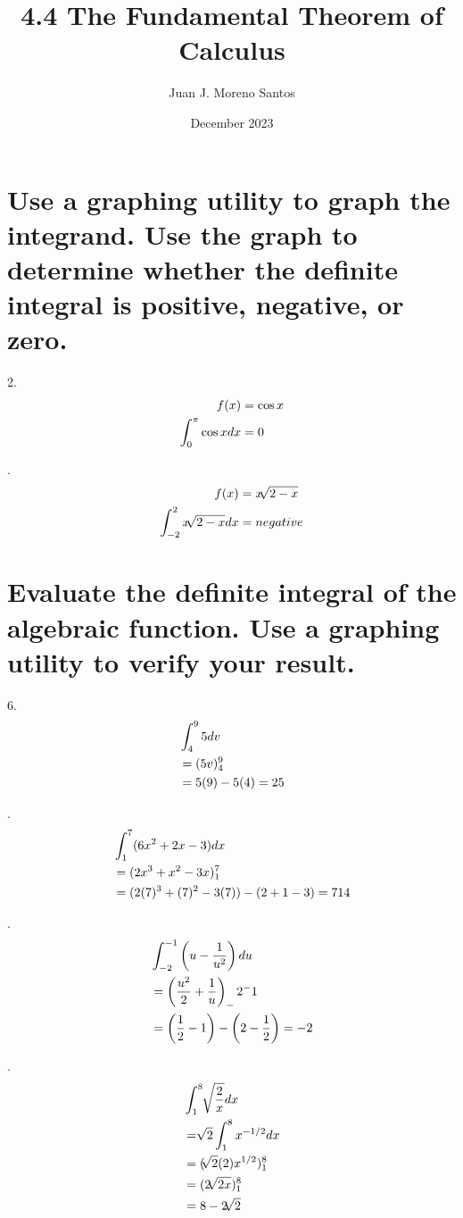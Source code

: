 \documentclass[11pt]{article}
\newcommand*{\vs}{\vspace{1cm}}
\newcommand*{\next}{\noindent}
\newcommand*{\set}{\setcounter{equation}{0}}
\begin{document}
\title{4.4 The Fundamental Theorem of Calculus}
\author{Juan J. Moreno Santos}
\date{December 2023}

\maketitle

\section{Use a graphing utility
to graph the integrand. Use the graph to determine whether the
definite integral is positive, negative, or zero.}
2.\begin{align}
    \set
    f(x)&=\cos x\\
    \int_{0}^{\pi}\cos xdx&=0
\end{align}

\vs\next
4.\begin{align}
    \set
    f(x)&=x\sqrt[]{2-x}\\
    \int_{-2}^{2}x\sqrt[]{2-x}dx&=negative
\end{align}

\section{Evaluate the definite integral of the algebraic
function. Use a graphing utility to verify your result.}
6.\begin{align}
    \set
    &\int_{4}^{9}5dv\\
    &=(5v)_4^9\\
    &=5(9)-5(4)=25
\end{align}

\vs\next
10.\begin{align}
    \set
    &\int_{1}^{7}(6x^2+2x-3)dx\\
    &=(2x^3+x^2-3x)_1^7\\
    &=(2(7)^3+(7)^2-3(7))-(2+1-3)=714
\end{align}

\vs\next
14.\begin{align}
    \set
    &\int_{-2}^{-1}\left(u-\frac{1}{u^2}\right)du\\
    &=\left(\frac{u^2}{2}+\frac{1}{u}\right)_-2^-1\\
    &=\left(\frac{1}{2}-1\right)-\left(2-\frac{1}{2}\right)=-2
\end{align}

\vs\next
18.\begin{align}
    \set
    &\int_{1}^{8}\sqrt[]{\frac{2}{x}}dx\\
    &=\sqrt[]{2}\int_{1}^{8}x^{-1/2}dx\\
    &=(\sqrt[]{2}(2)x^{1/2})_1^8\\
    &=(2\sqrt[]{2x})_1^8\\
    &=8-2\sqrt[]{2}
\end{align}
\end{document}

